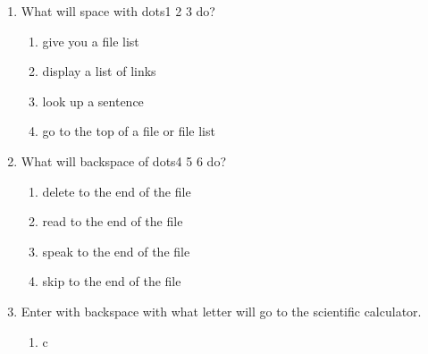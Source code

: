 \documentclass[10pt,letterpaper,twoside]{report}
\begin{document}
{{{{\begin{enumerate}
	      \begin{enumerate}
		      \item space
		            
		      \item backspace
		            
		      \item space with d
		            
		      \item enter with d
		            
		            
	      \end{enumerate}
	\item What will space with dots1 2 3 do?
	      
	      \begin{enumerate}
		      \item give you a file list
		            
		      \item display a list of links
		            
		      \item look up a sentence
		            
		      \item go to the top of a file or file list
		            
		            
	      \end{enumerate}
	\item What will backspace of dots4 5 6 do?
	      
	      \begin{enumerate}
		      \item delete to the end of the file
		            
		      \item read to the end of the file
		            
		      \item speak to the end of the file
		            
		      \item skip to the end of the file
		            
		            
	      \end{enumerate}
	\item Enter with backspace with what letter will go to the scientific calculator.
	      
	      \begin{enumerate}
		      \item c
		            

\end{enumerate}
\end{enumerate}}}}}
\end{document}
